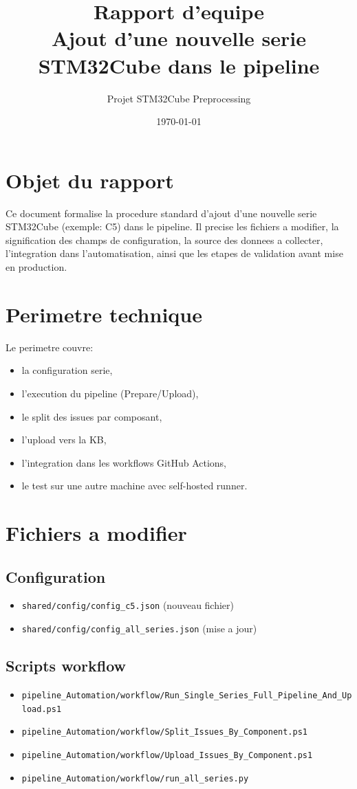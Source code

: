 \documentclass[11pt,a4paper]{article}
\title{Rapport d'equipe\\Ajout d'une nouvelle serie STM32Cube dans le pipeline}
\author{Projet STM32Cube Preprocessing}
\date{\today}
\begin{document}
\maketitle
\tableofcontents
\newpage

\section{Objet du rapport}
Ce document formalise la procedure standard d'ajout d'une nouvelle serie STM32Cube
(exemple: C5) dans le pipeline. Il precise les fichiers a modifier, la signification
des champs de configuration, la source des donnees a collecter, l'integration dans
l'automatisation, ainsi que les etapes de validation avant mise en production.

\section{Perimetre technique}
Le perimetre couvre:
\begin{itemize}[leftmargin=*]
  \item la configuration serie,
  \item l'execution du pipeline (Prepare/Upload),
  \item le split des issues par composant,
  \item l'upload vers la KB,
  \item l'integration dans les workflows GitHub Actions,
  \item le test sur une autre machine avec self-hosted runner.
\end{itemize}

\section{Fichiers a modifier}
\subsection{Configuration}
\begin{itemize}[leftmargin=*]
  \item \texttt{shared/config/config\_c5.json} (nouveau fichier)
  \item \texttt{shared/config/config\_all\_series.json} (mise a jour)
\end{itemize}

\subsection{Scripts workflow}
\begin{itemize}[leftmargin=*]
  \item \texttt{pipeline\_Automation/workflow/Run\_Single\_Series\_Full\_Pipeline\_And\_Upload.ps1}
  \item \texttt{pipeline\_Automation/workflow/Split\_Issues\_By\_Component.ps1}
  \item \texttt{pipeline\_Automation/workflow/Upload\_Issues\_By\_Component.ps1}
  \item \texttt{pipeline\_Automation/workflow/run\_all\_series.py}
\end{itemize}
\end{document}
